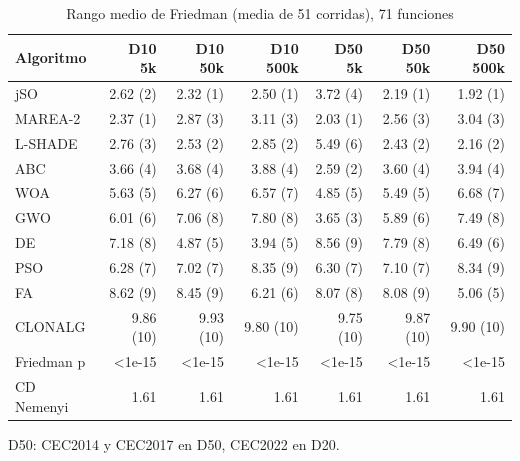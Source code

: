 \begin{table}[ht]\centering\small
\caption{Rango medio de Friedman (media de 51 corridas), 71 funciones}
\begin{tabular}{lrrrrrr}
\toprule
Algoritmo & D10 5k & D10 50k & D10 500k & D50 5k & D50 50k & D50 500k \\
\midrule
jSO & 2.62 (2) & 2.32 (1) & 2.50 (1) & 3.72 (4) & 2.19 (1) & 1.92 (1) \\
MAREA-2 & 2.37 (1) & 2.87 (3) & 3.11 (3) & 2.03 (1) & 2.56 (3) & 3.04 (3) \\
L-SHADE & 2.76 (3) & 2.53 (2) & 2.85 (2) & 5.49 (6) & 2.43 (2) & 2.16 (2) \\
ABC & 3.66 (4) & 3.68 (4) & 3.88 (4) & 2.59 (2) & 3.60 (4) & 3.94 (4) \\
WOA & 5.63 (5) & 6.27 (6) & 6.57 (7) & 4.85 (5) & 5.49 (5) & 6.68 (7) \\
GWO & 6.01 (6) & 7.06 (8) & 7.80 (8) & 3.65 (3) & 5.89 (6) & 7.49 (8) \\
DE & 7.18 (8) & 4.87 (5) & 3.94 (5) & 8.56 (9) & 7.79 (8) & 6.49 (6) \\
PSO & 6.28 (7) & 7.02 (7) & 8.35 (9) & 6.30 (7) & 7.10 (7) & 8.34 (9) \\
FA & 8.62 (9) & 8.45 (9) & 6.21 (6) & 8.07 (8) & 8.08 (9) & 5.06 (5) \\
CLONALG & 9.86 (10) & 9.93 (10) & 9.80 (10) & 9.75 (10) & 9.87 (10) & 9.90 (10) \\
Friedman p & <1e-15 & <1e-15 & <1e-15 & <1e-15 & <1e-15 & <1e-15 \\
CD Nemenyi & 1.61 & 1.61 & 1.61 & 1.61 & 1.61 & 1.61 \\
\bottomrule
\end{tabular}
\par\footnotesize D50: CEC2014 y CEC2017 en D50, CEC2022 en D20.
\end{table}
